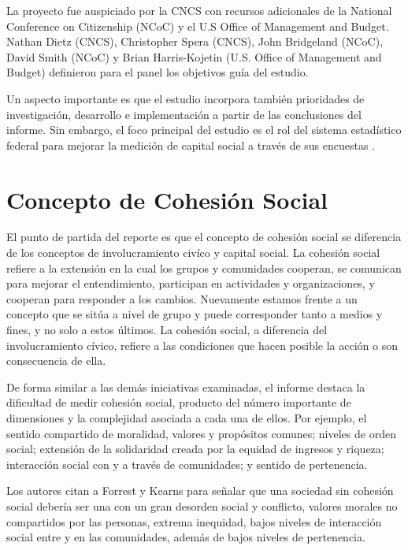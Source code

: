 \documentclass[
  12pt,
]{book}
\begin{document}
La proyecto fue auspiciado por la CNCS con recursos adicionales de la
National Conference on Citizenship (NCoC) y el U.S Office of Management
and Budget. Nathan Dietz (CNCS), Christopher Spera (CNCS), John
Bridgeland (NCoC), David Smith (NCoC) y Brian Harris-Kojetin (U.S.
Office of Management and Budget) definieron para el panel los objetivos
guía del estudio.

Un aspecto importante es que el estudio incorpora también prioridades de
investigación, desarrollo e implementación a partir de las conclusiones
del informe. Sin embargo, el foco principal del estudio es el rol del
sistema estadístico federal para mejorar la medición de capital social a
través de sus encuestas \citep{prewitt_Civic_2014}.

\hypertarget{concepto-de-cohesiuxf3n-social-3}{%
\section{Concepto de Cohesión Social}\label{concepto-de-cohesiuxf3n-social-3}}

El punto de partida del reporte es que el concepto de cohesión social se
diferencia de los conceptos de involucramiento civíco y capital social.
La cohesión social refiere a la extensión en la cual los grupos y
comunidades cooperan, se comunican para mejorar el entendimiento,
participan en actividades y organizaciones, y cooperan para responder a
los cambios. Nuevamente estamos frente a un concepto que se sitúa a
nivel de grupo y puede corresponder tanto a medios y fines, y no solo a
estos últimos. La cohesión social, a diferencia del involucramiento
cívico, refiere a las condiciones que hacen posible la acción o son
consecuencia de ella.

De forma similar a las demás iniciativas examinadas, el informe destaca
la dificultad de medir cohesión social, producto del número importante
de dimensiones y la complejidad asociada a cada una de ellos. Por
ejemplo, el sentido compartido de moralidad, valores y propósitos
comunes; niveles de orden social; extensión de la solidaridad creada por
la equidad de ingresos y riqueza; interacción social con y a través de
comunidades; y sentido de pertenencia.

Los autores citan a Forrest y Kearns para señalar que una sociedad sin
cohesión social debería ser una con un gran desorden social y conflicto,
valores morales no compartidos por las personas, extrema inequidad,
bajos niveles de interacción social entre y en las comunidades, además
de bajos niveles de pertenencia.
\end{document}
